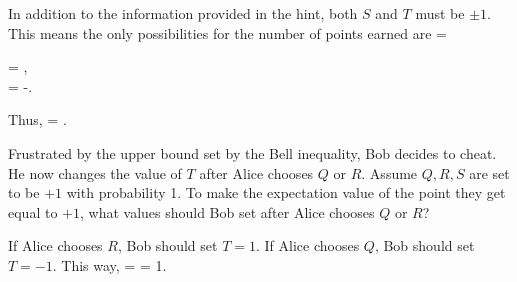 \begin{solution}
	In addition to the information provided in the hint, both $S$ and $T$ must be $\pm1$.  This means the only possibilities for the number of points earned are
	\beq
		 = \begin{cases}
			 = , \\[2ex]
			 = -.
		\end{cases}
	\eeq
	Thus,
	\beq
		\Max = .
	\eeq
	\vfix
\end{solution}



\begin{problem}
	Frustrated by the upper bound set by the Bell inequality, Bob decides to cheat.  He now changes the value of $T$ after Alice chooses $Q$ or $R$.  Assume $Q,R,S$ are set to be $+1$ with probability 1.  To make the expectation value of the point they get equal to $+1$, what values should Bob set after Alice chooses $Q$ or $R$?
\end{problem}

\begin{solution}
	If Alice chooses $R$, Bob should set $T = 1$.  If Alice chooses $Q$, Bob should set $T = -1$.  This way,
	\beq
		= 
		= 1.
	\eeq
	\vfix
\end{solution}



\newcommand{\kQp}{\ket{Q_+}}
\newcommand{\kQm}{\ket{Q_-}}
\newcommand{\kTp}{\ket{T_+}}
\newcommand{\kTm}{\ket{T_-}}
\newcommand{\Apm}{A_\pm}

\newcommand{\alp}{\alpha}
\newcommand{\sig}{\sigma}
\newcommand{\sigq}{\sig_1}
\newcommand{\sigw}{\sig_2}
\newcommand{\sige}{\sig_3}

\newcommand{\ah}{\vb{\hat{a}}}
\newcommand{\bh}{\vb{\hat{b}}}
\newcommand{\nh}{\vb{\hat{n}}}
\newcommand{\tht}{\theta}
\newcommand{\thtab}{\tht_{ab}}
\newcommand{\Sn}{\vS \vdot \nh}

\newcommand{\kSnp}{\ket{\Sn; +}}
\newcommand{\kSnm}{\ket{\Sn; -}}
\newcommand{\kup}{\ket{\up}}
\newcommand{\kdn}{\ket{\dn}}


